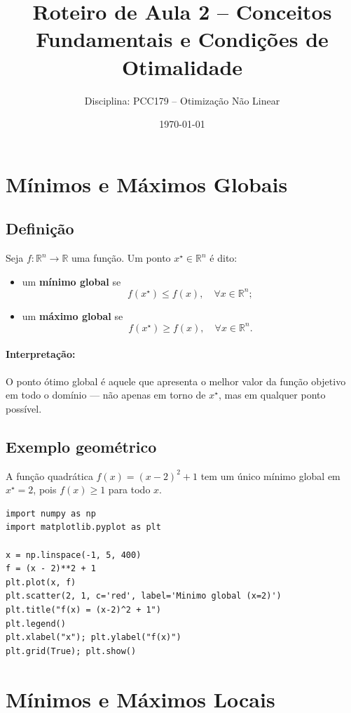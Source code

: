 \documentclass[9pt,a4paper]{extarticle}
\begin{document}
\title{Roteiro de Aula 2 -- Conceitos Fundamentais e Condições de Otimalidade}
\author{Disciplina: PCC179 -- Otimização Não Linear}
\date{\today}
\maketitle

\section{Mínimos e Máximos Globais}

\subsection*{Definição}
Seja $f:\mathbb{R}^n \to \mathbb{R}$ uma função.  
Um ponto $x^\star \in \mathbb{R}^n$ é dito:
\begin{itemize}
    \item um \textbf{mínimo global} se
    \[
    f(x^\star) \le f(x), \quad \forall x \in \mathbb{R}^n;
    \]
    \item um \textbf{máximo global} se
    \[
    f(x^\star) \ge f(x), \quad \forall x \in \mathbb{R}^n.
    \]
\end{itemize}

\paragraph{Interpretação:}
O ponto ótimo global é aquele que apresenta o melhor valor da função objetivo em todo o domínio — não apenas em torno de $x^\star$, mas em qualquer ponto possível.

\subsection*{Exemplo geométrico}
A função quadrática $f(x) = (x-2)^2 + 1$ tem um único mínimo global em $x^\star = 2$, pois $f(x) \ge 1$ para todo $x$.

\begin{lstlisting}
import numpy as np
import matplotlib.pyplot as plt

x = np.linspace(-1, 5, 400)
f = (x - 2)**2 + 1
plt.plot(x, f)
plt.scatter(2, 1, c='red', label='Minimo global (x=2)')
plt.title("f(x) = (x-2)^2 + 1")
plt.legend()
plt.xlabel("x"); plt.ylabel("f(x)")
plt.grid(True); plt.show()
\end{lstlisting}

\section{Mínimos e Máximos Locais}
\end{document}
